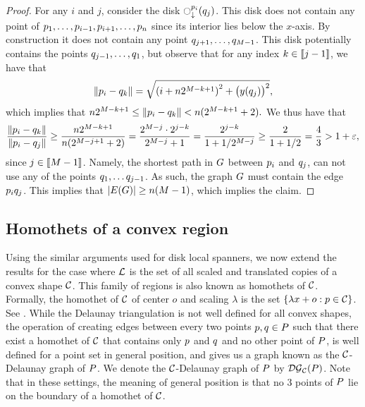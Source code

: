 \documentclass[12pt]{article}%
\begin{document}
\begin{proof}
    For any $i$ and $j$, consider the disk
    $\diskVY{\pa_i}{\pb_j}$. This disk does not contain any point of
    $p_1,\ldots, p_{i-1}, p_{i+1}, \ldots, p_{n}$ since its
    interior lies below the $x$-axis. By construction it does not
    contain any point $q_{j+1}, \ldots, q_{M-1}$. This disk
    potentially contains the points $q_{j-1}, \ldots, q_1$,
    but observe that for any index $k \in \IRX{j-1}$, we have that
    \begin{equation*}
        \dY{\pa_i}{\pb_k} %
        =%
        \sqrt{ \pth{i + n 2^{M-k+1} }^2 + \bigl( y(\pb_j) \bigr)^2 },
    \end{equation*}
    which implies that
    \begin{math}
        n 2^{M-k+1}%
        \leq%
        \dY{\pa_i}{\pb_k} %
        <%
        n( 2^{M-k+1} +2).
    \end{math}
    We thus have that
    \begin{equation*}
        \frac{\dY{\pa_i}{\pb_k}}{\dY{\pa_i}{\pb_j}}
        \geq%
        \frac{n 2^{M-k+1}}{n( 2^{M-j+1} +2)}
        =%
        \frac{ 2^{M-j}\cdot 2^{j-k}}{ 2^{M-j} +1}
        =%
        \frac{  2^{j-k}}{ 1 + 1/2^{M-j}}
        \geq
        \frac{2}{1+1/2}
        = \frac{4}{3}
        > 1+\eps,
    \end{equation*}
    since $j \in \IRX{M-1}$.  Namely, the shortest path in $G$
    between $p_i$ and $q_j$, can not use any of the points
    $q_{1}, \ldots q_{j-1}$. As such, the graph $G$ must contain
    the edge $p_i q_j$. This implies that
    $|\EGX{\G}| \geq n (M-1)$, which implies the claim.
\end{proof}






\subsection{Homothets of a convex region}
\label{subsection:homothets}

Using the similar arguments used for disk local spanners, we now extend the results for the case where
$\mathcal{L}$ is the set of all scaled and translated copies of a
convex shape $\mathcal{C}$. This family of regions is also known as homothets of $\mathcal{C}$. Formally, the homothet of $\mathcal{C}$ of center $o$ and scaling $\lambda$ is the set $\{\lambda x+o : p \in \mathcal{C}\}$. See . While the Delaunay triangulation is not well
defined for all convex shapes, the operation of creating edges between every
two points $p,q\in P$ such that there exist a homothet of $\mathcal{C}$ that
contains only $p$ and $q$ and no other point of $P$, is well
defined for a point set in general position, and gives us a graph known as the $\mathcal{C}$-Delaunay graph of $P$. We denote the $\mathcal{C}$-Delaunay graph of $P$ by $\mathcal{DG}_{\mathcal{C}}(P)$. 
Note that in these settings, the meaning of general position is that no 3 points of $P$ lie on the boundary of a homothet of $\mathcal{C}$.
\end{document}
